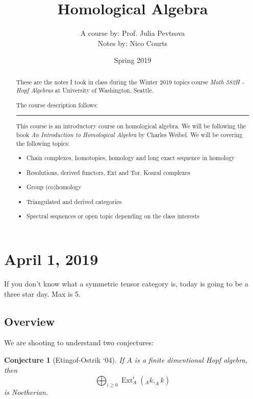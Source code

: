 \documentclass[12pt]{article}
\theoremstyle{break}
\theoremstyle{nonumberbreak}
\theoremstyle{changebreak}
\theoremstyle{break}
\theoremstyle{nonumberbreak}
\theoremstyle{nonumberplain}
\newtheorem{conj}{Conjecture}
\theoremstyle{change}
\newcommand*{\brk}{
\rule{2in}{.1pt}
}
\DeclareMathOperator{\Ext}{Ext}
\begin{document}
\title{Homological Algebra\vspace{-1ex}}
\author{A course by: Prof. Julia Pevtsova\\
Notes by: Nico Courts}
\date{Spring 2019}
\maketitle

\renewcommand{\abstractname}{Introduction}
\begin{abstract}
	These are the notes I took in class during the Winter 2019 topics course
	\textit{Math 582H - Hopf Algebras} at University of Washington, Seattle. 
	
	The course description follows:

	\brk

	This course is an introductory course on homological algebra. We will be following the 
	book \textit{An Introduction to Homological Algebra} by Charles Weibel. We will be
	covering the following topics:

\begin{itemize}
	\item Chain complexes, homotopies, homology and long exact sequence in homology
	\item Resolutions, derived functors, Ext and Tor. Koszul complexes
	\item Group (co)homology
	\item Triangulated and derived categories
	\item Spectral sequences or open topic depending on the class interests
\end{itemize}
\end{abstract}

\section{April 1, 2019}
If you don't know what a symmetric tensor category is, today is going to be a three 
star day. Max is 5.

\subsection{Overview}
We are shooting to understand two conjectures:

\begin{conj}[Etingof-Ostrik `04]
	If $A$ is a finite dimentional Hopf algebra, then 
	\[\bigoplus_{i\ge 0}\Ext_A^i(_Ak, _Ak)\]
	is Noetherian.
\end{conj}
\end{document}

